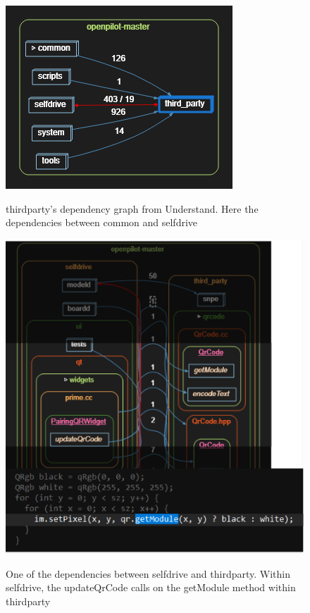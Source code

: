 \documentclass[12pt]{article}
\begin{document}
    \begin{figure}[H]
        \centering
        \includegraphics[scale=1]{Dependencies-third_party.png}\\
        \caption{third\textunderscore party's dependency graph from Understand. Here the dependencies between common and selfdrive}
        \label{fig:enter-label}
    \end{figure}

    \begin{figure}[H]
        \centering
        \includegraphics[scale=1]{getmodule.png}\\
        \caption{One of the dependencies between selfdrive and third\textunderscore party. Within selfdrive, the updateQrCode calls on the getModule method within third\textunderscore party}
        \label{fig:enter-label}
    \end{figure}
\end{document}

